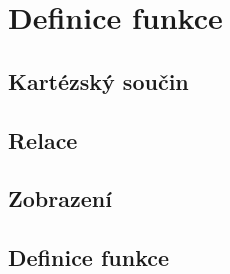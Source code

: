 \section{Definice funkce}
\label{sec:funkce-definice}

\subsection{Kartézský součin}
\label{subsec:funkce-def-kart-soucin}

\subsection{Relace}
\label{subsec:funkce-def-relace}

\subsection{Zobrazení}
\label{subsec:funkce-def-zobrazeni}

\subsection{Definice funkce}
\label{subsec:funkce-def-def}
